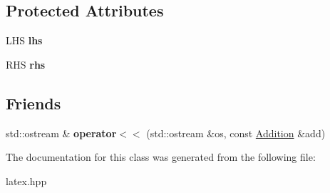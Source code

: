 \subsection*{Protected Attributes}
\begin{DoxyCompactItemize}
\item 
\hypertarget{classlatex_1_1math_1_1Addition_ac8d2192970f9214c489f803756453bf0}{L\-H\-S {\bfseries lhs}}\label{classlatex_1_1math_1_1Addition_ac8d2192970f9214c489f803756453bf0}

\item 
\hypertarget{classlatex_1_1math_1_1Addition_aa5abec9e5629652699b7e34887ec94a6}{R\-H\-S {\bfseries rhs}}\label{classlatex_1_1math_1_1Addition_aa5abec9e5629652699b7e34887ec94a6}

\end{DoxyCompactItemize}
\subsection*{Friends}
\begin{DoxyCompactItemize}
\item 
\hypertarget{classlatex_1_1math_1_1Addition_a4d362127264a2ef4b53edb9c7a983b18}{std\-::ostream \& {\bfseries operator$<$$<$} (std\-::ostream \&os, const \hyperlink{classlatex_1_1math_1_1Addition}{Addition} \&add)}\label{classlatex_1_1math_1_1Addition_a4d362127264a2ef4b53edb9c7a983b18}

\end{DoxyCompactItemize}


The documentation for this class was generated from the following file\-:\begin{DoxyCompactItemize}
\item 
latex.\-hpp\end{DoxyCompactItemize}
